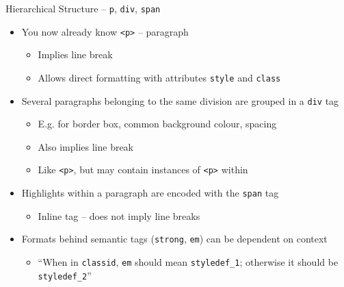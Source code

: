 \begin{frame}[fragile]{Hierarchical Structure -- \texttt{p}, \texttt{div}, \texttt{span}}
%
\begin{itemize}
\item You now already know \texttt{<p>} -- paragraph
	\begin{itemize}
	\item Implies line break
	\item Allows direct formatting with attributes \texttt{style} and \texttt{class}
	\end{itemize}
\pause
\item Several paragraphs belonging to the same division are grouped in a \texttt{div} tag
	\begin{itemize}
	\item E.\;g. for border box, common background colour, spacing
	\item Also implies line break
	\item[\Thus] Like \texttt{<p>}, but may contain instances of \texttt{<p>} within
	\end{itemize}
\pause
\item Highlights within a paragraph are encoded with the \texttt{span} tag
	\begin{itemize}
	\item Inline tag -- does not imply line breaks
	\end{itemize}
\pause
\item Formats behind semantic tags (\zB \texttt{strong}, \texttt{em}) can be dependent on context
	\begin{itemize}
	\item \enquote{When in \texttt{classid}, \texttt{em} should mean \texttt{styledef\_1}; otherwise it should be \texttt{styledef\_2}}
	\end{itemize}
\end{itemize}
%
\end{frame}


